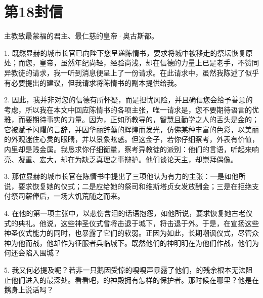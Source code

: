 
\section{第18封信}

\par

主教致最蒙福的君主、最仁慈的皇帝·奥古斯都。\par

1. 既然显赫的城市长官已向陛下您呈递陈情书，要求将城中被移走的祭坛恢复原处；而您，皇帝，虽然年纪尚轻，经验尚浅，却在信德的力量上已是老手，不赞同异教徒的请求，我一听到消息便呈上了一份请求。在此请求中，虽然我陈述了似乎有必要提出的建议，但我请求将陈情书的副本提供给我。\par

2. 因此，我并非对您的信德有所怀疑，而是担忧风险，并且确信您会给予善意的考虑，所以我在本文中回应陈情书的各项主张，唯一请求是，您不要期待语言的优雅，而要期待事实的力量。因为，正如所教导的，智慧且勤学之人的舌头是金的；它被赋予闪耀的言辞，并因华丽辞藻的辉煌而发光，仿佛某种丰富的色彩，以美丽的外观迷住心灵的眼睛，并以景象眩惑。但这金子，若你仔细察考，外表有价值，内里却是贱金属。我恳求你仔细衡量，察考异教徒的派别：他们的言语，听起来响亮、凝重、宏大，却在为缺乏真理之事辩护。他们谈论天主，却崇拜偶像。\par

3. 那位显赫的城市长官在陈情书中提出了三项他认为有力的主张：一是如他所说，要求恢复她的仪式；二是应给她的祭司和维斯塔贞女发放酬金；三是在拒绝支付祭司薪俸后，一场大饥荒随之而来。\par

4. 在他的第一项主张中，以悲伤含泪的话语抱怨，如他所说，要求恢复她古老仪式的典礼。他说，这些神圣仪式曾将击退于城下，将击退于外。于是，在宣扬这些神圣仪式能力的同时，也暴露了它们的软弱。正因为如此，长期嘲讽仪式，尽管众神为他而战，他却作为征服者兵临城下。既然他们的神明明在为他们作战，他们为何还会陷入围城？\par

5. 我又何必提及呢？若非一只鹅因受惊的嘎嘎声暴露了他们，的残余根本无法阻止他们进入的最深处。看看吧，的神殿拥有怎样的保护者。那时候在哪里？他是在鹅身上说话吗？\par

